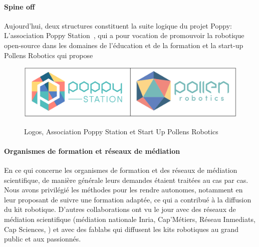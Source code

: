         \paragraph{Spine off}\label{sec:spineoff}
            Aujourd'hui, deux structures constituent la suite logique du projet Poppy: \Li L'association Poppy Station~, qui a pour vocation de promouvoir la robotique open-source dans les domaines de l'éducation et de la formation et \ii la start-up Pollens Robotics qui propose ~
            \begin{figure}[!h]
                \centering\label{fig:spineoff}
                \includegraphics[width=\linewidth]{Figures/Poppy-spineoff.png}
                \caption{Logos, Association Poppy Station et Start Up Pollens Robotics}
            \end{figure}
        \paragraph{Organismes de formation et réseaux de médiation}
            En ce qui concerne les organismes de formation et des réseaux de médiation scientifique, de manière générale leurs demandes étaient traitées au cas par cas. Nous avons privilégié les méthodes pour les rendre autonomes, notamment en leur proposant de suivre une formation adaptée, ce qui a contribué à la diffusion du kit robotique.
            D’autres collaborations ont vu le jour avec des réseaux de médiation scientifique (médiation nationale Inria, Cap'Métiers, Réseau Inmediats, Cap Sciences, \etc) et avec des fablabs qui diffusent les kits robotiques au grand public et aux passionnés.
